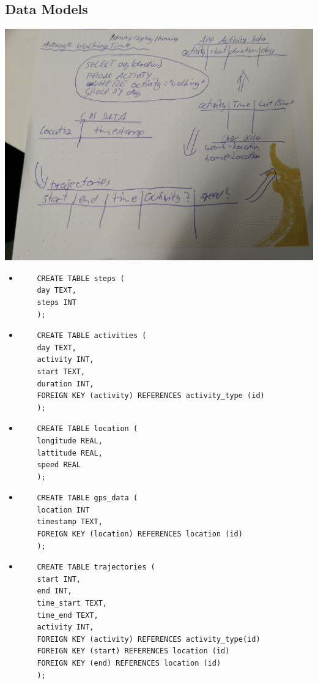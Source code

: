 \subsection{Data Models}
\includegraphics[width=\textwidth]{data/data-model.jpg}

\begin{itemize}
	\item \begin{verbatim}
	CREATE TABLE steps (
	day TEXT,
	steps INT
	);
	\end{verbatim}
	\item \begin{verbatim}
	CREATE TABLE activities (
	day TEXT,
	activity INT,
	start TEXT,
	duration INT,
	FOREIGN KEY (activity) REFERENCES activity_type (id)
	);
	\end{verbatim}
	\item \begin{verbatim}
	CREATE TABLE location (
	longitude REAL,
	lattitude REAL,
	speed REAL
	);
	\end{verbatim}
	\item \begin{verbatim}
	CREATE TABLE gps_data (
	location INT
	timestamp TEXT,
	FOREIGN KEY (location) REFERENCES location (id)
	);
	\end{verbatim}
	\item \begin{verbatim}
	CREATE TABLE trajectories (
	start INT,
	end INT,
	time_start TEXT,
	time_end TEXT,
	activity INT,
	FOREIGN KEY (activity) REFERENCES activity_type(id)
	FOREIGN KEY (start) REFERENCES location (id)
	FOREIGN KEY (end) REFERENCES location (id)
	);
	\end{verbatim}
\end{itemize}

